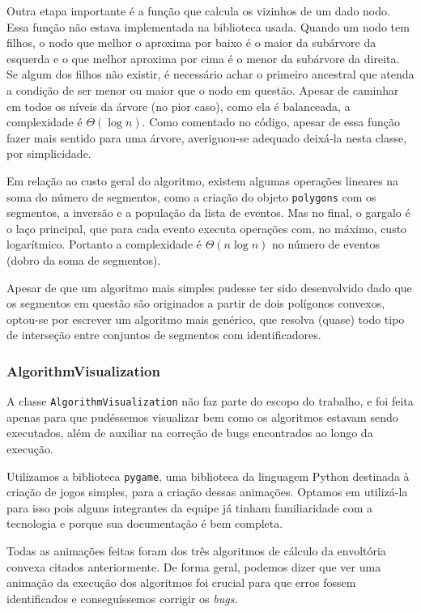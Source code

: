 \documentclass{article}
\begin{document}
Outra etapa importante é a função que calcula os vizinhos de um dado nodo. Essa função não estava implementada na biblioteca usada. Quando um nodo tem filhos, o nodo que melhor o aproxima por baixo é o maior da subárvore da esquerda e o que melhor aproxima por cima é o menor da subárvore da direita. Se algum dos filhos não existir, é necessário achar o primeiro ancestral que atenda a condição de ser menor ou maior que o nodo em questão. Apesar de caminhar em todos os níveis da árvore (no pior caso), como ela é balanceada, a complexidade é \( \Theta(\log n) \). Como comentado no código, apesar de essa função fazer mais sentido para uma árvore, averiguou-se adequado deixá-la nesta classe, por simplicidade.

Em relação ao custo geral do algoritmo, existem algumas operações lineares na soma do número de segmentos, como a criação do objeto \texttt{polygons} com os segmentos, a inversão e a população da lista de eventos. Mas no final, o gargalo é o laço principal, que para cada evento executa operações com, no máximo, custo logarítmico. Portanto a complexidade é \( \Theta(n \log n) \) no número de eventos (dobro da soma de segmentos).

Apesar de que um algoritmo mais simples pudesse ter sido desenvolvido dado que os segmentos em questão são originados a partir de dois polígonos convexos, optou-se por escrever um algoritmo mais genérico, que resolva (quase) todo tipo de interseção entre conjuntos de segmentos com identificadores.

\subsubsection{AlgorithmVisualization}

A classe \texttt{AlgorithmVisualization} não faz parte do escopo do trabalho, e foi feita apenas para que pudéssemos visualizar bem como os algoritmos estavam sendo executados, além de auxiliar na correção de bugs encontrados ao longo da execução.

Utilizamos a biblioteca \texttt{pygame}, uma biblioteca da linguagem Python destinada à criação de jogos simples, para a criação dessas animações. Optamos em utilizá-la para isso pois alguns integrantes da equipe já tinham familiaridade com a tecnologia e porque sua documentação é bem completa.

Todas as animações feitas foram dos três algoritmos de cálculo da envoltória convexa citados anteriormente. De forma geral, podemos dizer que ver uma animação da execução dos algoritmos foi crucial para que erros fossem identificados e conseguíssemos corrigir os \textit{bugs}.
\end{document}
